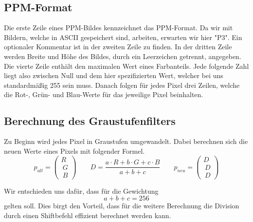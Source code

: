 \documentclass[course=erap]{aspdoc}
\begin{document}
	\subsection{PPM-Format}
	Die erste Zeile eines PPM-Bildes kennzeichnet das PPM-Format. Da wir mit Bildern, welche in ASCII gespeichert sind, arbeiten, erwarten wir hier "P3".
	Ein optionaler Kommentar ist in der zweiten Zeile zu finden.
	In der dritten Zeile werden Breite und Höhe des Bildes, durch ein Leerzeichen getrennt, angegeben.
    Die vierte Zeile enthält den maximalen Wert eines Farbanteils. Jede folgende Zahl liegt also zwischen Null und dem hier spezifizierten Wert, welcher bei uns standardmäßig 255 sein muss.
    Danach folgen für jedes Pixel drei Zeilen, welche die Rot-, Grün- und Blau-Werte für das jeweilige Pixel beinhalten.
	
	\subsection{Berechnung des Graustufenfilters}
	Zu Beginn wird jedes Pixel in Graustufen umgewandelt. Dabei berechnen sich die neuen Werte eines Pixels mit folgender Formel.
	\begin{equation}
	\label{(1)}
	p_{alt} =  \begin{pmatrix}R \\\ G \\\ B \end{pmatrix} \qquad D = \frac{a \cdot R  + b \cdot G  + c \cdot B }{a + b + c} \qquad p_{neu} =  \begin{pmatrix}D \\\ D \\\ D \end{pmatrix}
	\end{equation}	

	Wir entschieden uns dafür, dass für die Gewichtung \begin{equation}
	\label{(2)}
	a + b + c = 256
	\end{equation} gelten soll. Dies birgt den Vorteil, dass für die weitere Berechnung die Division durch einen Shiftbefehl effizient berechnet werden kann.
	
\end{document}
